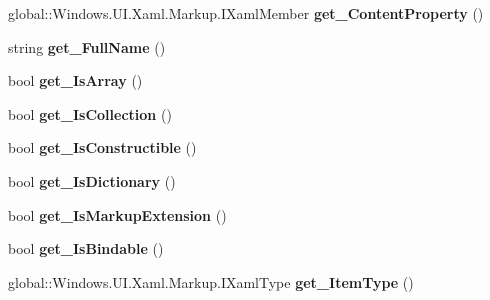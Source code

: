 \begin{DoxyCompactItemize}
global\+::\+Windows.\+U\+I.\+Xaml.\+Markup.\+I\+Xaml\+Member {\bfseries get\+\_\+\+Content\+Property} ()
\item 
\mbox{\label{interface_windows_1_1_u_i_1_1_xaml_1_1_markup_1_1_i_xaml_type_a5c1dd332e5b51cd2bb878fc56640a7a8}} 
string {\bfseries get\+\_\+\+Full\+Name} ()
\item 
\mbox{\label{interface_windows_1_1_u_i_1_1_xaml_1_1_markup_1_1_i_xaml_type_a16b5c5eaeeaad7ca4f010931852df7e4}} 
bool {\bfseries get\+\_\+\+Is\+Array} ()
\item 
\mbox{\label{interface_windows_1_1_u_i_1_1_xaml_1_1_markup_1_1_i_xaml_type_a979e0b0e073ddfb9b26002ca80cd7af7}} 
bool {\bfseries get\+\_\+\+Is\+Collection} ()
\item 
\mbox{\label{interface_windows_1_1_u_i_1_1_xaml_1_1_markup_1_1_i_xaml_type_a36b2295d77f635d1f86673a460235f92}} 
bool {\bfseries get\+\_\+\+Is\+Constructible} ()
\item 
\mbox{\label{interface_windows_1_1_u_i_1_1_xaml_1_1_markup_1_1_i_xaml_type_a3508951681e7a45a895f3449fdda3a7c}} 
bool {\bfseries get\+\_\+\+Is\+Dictionary} ()
\item 
\mbox{\label{interface_windows_1_1_u_i_1_1_xaml_1_1_markup_1_1_i_xaml_type_aeee5bbd4f909ca50e0b2821c7b7da4e4}} 
bool {\bfseries get\+\_\+\+Is\+Markup\+Extension} ()
\item 
\mbox{\label{interface_windows_1_1_u_i_1_1_xaml_1_1_markup_1_1_i_xaml_type_a5d6ca2d2a8d5159df65277d6bc82b6ca}} 
bool {\bfseries get\+\_\+\+Is\+Bindable} ()
\item 
\mbox{\label{interface_windows_1_1_u_i_1_1_xaml_1_1_markup_1_1_i_xaml_type_a40ca59f3944675e6cdafc7f84915777e}} 
global\+::\+Windows.\+U\+I.\+Xaml.\+Markup.\+I\+Xaml\+Type {\bfseries get\+\_\+\+Item\+Type} ()

\end{DoxyCompactItemize}
